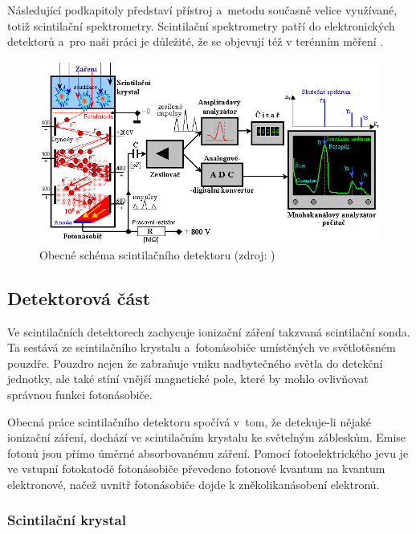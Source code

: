 Následující podkapitoly představí přístroj a~metodu současně velice využívané,
totiž scintilační spektrometry. Scintilační spektrometry patří do elektronických detektorů
a~pro naši práci je důležité, že se objevují též v terénním měření . 

  \begin{figure}[H]
   \centering
	\includegraphics[scale=0.75]{./pictures/scintilacni-detektor.png}
	\caption[Obecné schéma scintilačního detektoru]{Obecné schéma scintilačního detektoru
	(zdroj: \cite{spektrometrie})}
      \label{fig:scintilacni-detektor}
  \end{figure}

\subsection{Detektorová část}
\label{detektor}

Ve scintilačních detektorech zachycuje ionizační záření takzvaná scintilační sonda.
Ta sestává ze scintilačního krystalu a~fotonásobiče umístěných ve světlotěsném pou\-zdře.
Pouzdro nejen že zabraňuje vniku nadbytečného světla do detekční jednotky, ale také stíní
vnější magnetické pole, které by mohlo ovlivňovat správnou funkci fotonásobiče. 

Obecná práce scintilačního detektoru spočívá v~tom, že detekuje-li nějaké ionizační záření, dochází ve
scintilačním krystalu ke světelným zábleskům. Emise fotonů jsou přímo úměrné absorbovanému záření.
Pomocí fotoelektrického jevu je ve vstup\-ní fotokatodě fotonásobiče převedeno fotonové kvantum na kvantum
elektronové, načež uvnitř fotonásobiče dojde k zněkolikanásobení elektronů. 

\subsubsection{Scintilační krystal}
\label{krystal}


